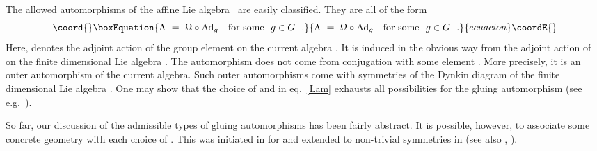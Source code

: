 \documentclass[12pt,a4paper]{article}
\providecommand{\mf}{\mathfrak} %
\def\asg{{\hat{\mf{g}}}}
\def\Ad{{\rm Ad}}
\def\id{{\rm id}}
\begin{document}
The allowed automorphisms \myHighlight{$\Lambda$}\coordHE{} of the affine Lie algebra~\myHighlight{$\asg_k$}\coordHE{}
are easily classified. They are all of the form 
\begin{equation}\coord{}\boxEquation{
  \label{Lam}
  \Lambda \ = \ \Omega \circ \Ad_g \ \ 
  \text{ for some } \  g \in G \ \ . 
}{
  \Lambda \ = \ \Omega \circ \Ad_g \ \ 
  \text{ for some } \  g \in G \ \ . 
}{ecuacion}\coordE{}\end{equation}
Here, \myHighlight{$\Ad_g$}\coordHE{} denotes the adjoint action of the group element 
\myHighlight{$g$}\coordHE{} on the current algebra \myHighlight{$\asg_k$}\coordHE{}. It is induced in the 
obvious way from the adjoint action of~\myHighlight{$G$}\coordHE{} on the finite 
dimensional Lie algebra \myHighlight{$\mf{g}$}\coordHE{}. The automorphism \myHighlight{$\Omega$}\coordHE{} 
does not come from conjugation with some element \myHighlight{$g$}\coordHE{}. More 
precisely, it is an outer automorphism of the current 
algebra. Such outer automorphisms \myHighlight{$\Omega = \Omega_\omega$}\coordHE{} 
come with symmetries \myHighlight{$\omega$}\coordHE{} of the Dynkin diagram of the 
finite dimensional Lie algebra \myHighlight{$\mf{g}$}\coordHE{}. One may show that 
the choice of \myHighlight{$\omega$}\coordHE{} and \myHighlight{$g \in G$}\coordHE{} in eq.~\eqref{Lam} 
exhausts all possibilities for the gluing automorphism
\myHighlight{$\Lambda$}\coordHE{} (see e.g.~\cite{Kac:1990}). 
\medskip

So far, our discussion of the admissible types of gluing 
automorphisms \myHighlight{$\Lambda$}\coordHE{} has been fairly abstract. It is 
possible, however, to associate some concrete geometry 
with each choice of \myHighlight{$\Lambda$}\coordHE{}. This was initiated in 
\cite{Alekseev:1998mc} for \myHighlight{$\omega = \id$}\coordHE{} and extended to 
non-trivial symmetries \myHighlight{$\omega \neq \id$}\coordHE{} in \cite{Felder:1999ka} 
(see also \cite{Gawedzki:1999bq}, \cite{Stanciu:1999id}). 
\smallskip
\end{document}
